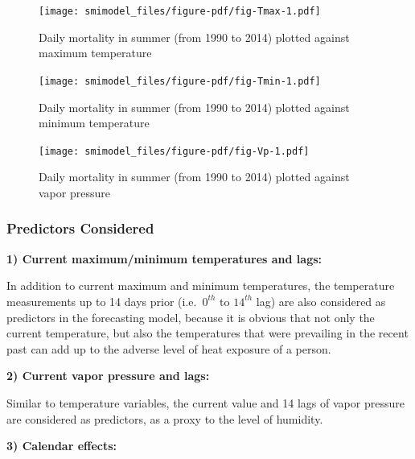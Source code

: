 \documentclass[11pt,a4paper,]{article}
\begin{document}
\begin{figure}

{\centering \texttt{[image: smimodel\_files/figure-pdf/fig-Tmax-1.pdf]}

}

\caption{\label{fig-Tmax}Daily mortality in summer (from 1990 to 2014)
plotted against maximum temperature}

\end{figure}

\begin{figure}

{\centering \texttt{[image: smimodel\_files/figure-pdf/fig-Tmin-1.pdf]}

}

\caption{\label{fig-Tmin}Daily mortality in summer (from 1990 to 2014)
plotted against minimum temperature}

\end{figure}

\begin{figure}

{\centering \texttt{[image: smimodel\_files/figure-pdf/fig-Vp-1.pdf]}

}

\caption{\label{fig-Vp}Daily mortality in summer (from 1990 to 2014)
plotted against vapor pressure}

\end{figure}

\hypertarget{predictors-considered}{%
\subsubsection{Predictors Considered}\label{predictors-considered}}

\textbf{1) Current maximum/minimum temperatures and lags:}

In addition to current maximum and minimum temperatures, the temperature
measurements up to 14 days prior (i.e.~\(0^{th}\) to \(14^{th}\) lag)
are also considered as predictors in the forecasting model, because it
is obvious that not only the current temperature, but also the
temperatures that were prevailing in the recent past can add up to the
adverse level of heat exposure of a person.

\textbf{2) Current vapor pressure and lags:}

Similar to temperature variables, the current value and 14 lags of vapor
pressure are considered as predictors, as a proxy to the level of
humidity.

\textbf{3) Calendar effects:}
\end{document}
